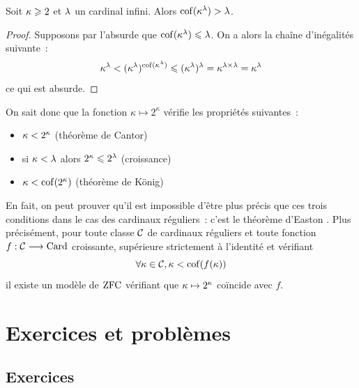 \begin{theorem}
  Soit $\kappa \geqslant 2$ et $\lambda$ un cardinal infini. Alors
  $\operatorname{cof}(\kappa^\lambda) > \lambda$.
\end{theorem}

\begin{proof}
  Supposons par l'absurde que $\operatorname{cof}(\kappa^\lambda) \leqslant \lambda$. On a alors la
  chaîne d'inégalités suivante~:
  \[\kappa^\lambda < (\kappa^\lambda)^{\operatorname{cof}(\kappa^\lambda)} \leqslant
  (\kappa^\lambda)^\lambda = \kappa^{\lambda \times \lambda} = \kappa^\lambda\]
  ce qui est absurde.
\end{proof}

On sait donc que la fonction $\kappa \mapsto 2^\kappa$ vérifie les propriétés
suivantes~:
\begin{itemize}
\item $\kappa < 2^\kappa$ (théorème de Cantor)
\item si $\kappa < \lambda$ alors $2^\kappa \leqslant 2^\lambda$ (croissance)
\item $\kappa < \operatorname{cof}(2^\kappa)$ (théorème de König)
\end{itemize}

En fait, on peut prouver qu'il est impossible d'être plus précis que ces trois
conditions dans le cas des cardinaux réguliers~: c'est le théorème d'Easton
\cite{Easton1970}. Plus précisément, pour toute classe $\mathcal{C}$ de cardinaux
réguliers et toute fonction $f : \displaystyle \mathcal{C} \longrightarrow \operatorname{Card}$
croissante, supérieure strictement à l'identité et vérifiant
\[\forall \kappa \in \mathcal{C}, \kappa < \operatorname{cof}(f(\kappa))\]
il existe un modèle de $\operatorname{ZFC}$ vérifiant que $\kappa \mapsto 2^\kappa$ coïncide
avec $f$.

\clearpage

\section{Exercices et problèmes}

\subsection{Exercices}

